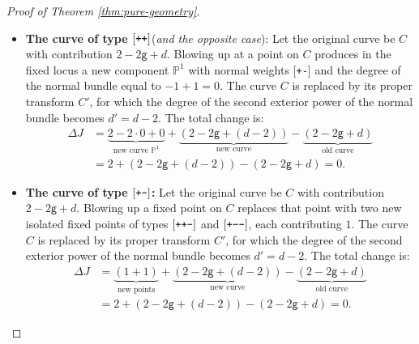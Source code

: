 \documentclass[12pt,a4paper]{amsart}
\theoremstyle{definition}
\theoremstyle{remark}
\newcommand{\lp}{\textup{\texttt{+}}}
\newcommand{\lm}{\textup{\texttt{-}}}
\begin{document}
\begin{proof}[Proof of Theorem \ref{thm:pure-geometry}]
\begin{itemize}
    \item \textbf{The curve of type $[\lp\lp]$}(\textit{and the opposite case}):  Let the original curve be $C$ with contribution $2 - 2\mathsf{g} + d$. Blowing up at a point on $C$ produces in the fixed locus a new component $\mathbb P^1$ with normal weights [\lp\lm] and the degree of the normal bundle equal to $-1+1=0$. The curve $C$ is replaced by its proper transform $C'$, for which the degree of the second exterior power of the normal bundle becomes $d' = d-2$. The total change is:
    \begin{align}
        \Delta J &= \underbrace{2-2\cdot 0+0}_{\text{new curve }\mathbb P^1} + \underbrace{(2 - 2\mathsf{g} + (d-2))}_{\text{new curve}} - \underbrace{(2 - 2\mathsf{g} + d)}_{\text{old curve}} \\
        &= 2 + (2 - 2\mathsf{g} + (d - 2)) - (2 - 2\mathsf{g} + d) = 0.
    \end{align}
    \item \textbf{The curve of type $[\lp\lm]$:} Let the original curve be $C$ with contribution $2 - 2\mathsf{g} + d$. Blowing up a fixed point on $C$ replaces that point with two new isolated fixed points of types $[\lp\lp\lm]$ and $[\lp\lm\lm]$, each contributing $1$. The curve $C$ is replaced by its proper transform $C'$, for which the degree of the second exterior power of the normal bundle becomes $d' = d-2$. The total change is:
    \begin{align}
        \Delta J &= \underbrace{(1 + 1)}_{\text{new points}} + \underbrace{(2 - 2\mathsf{g} + (d-2))}_{\text{new curve}} - \underbrace{(2 - 2\mathsf{g} + d)}_{\text{old curve}} \\
        &= 2 + (2 - 2\mathsf{g} + (d - 2))
        - (2 - 2\mathsf{g} + d) = 0.
    \end{align}
\end{itemize}


\end{proof}
\end{document}
